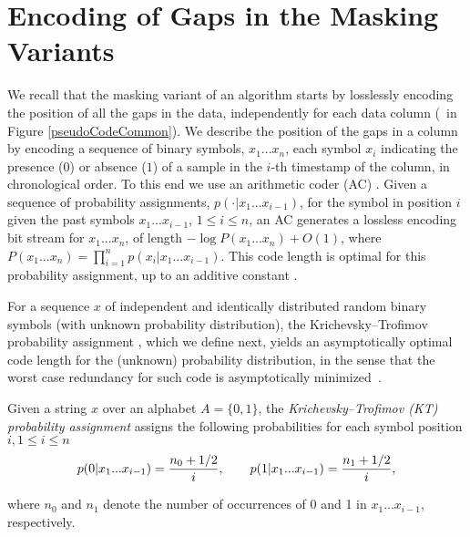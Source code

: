 
\section{Encoding of Gaps in the Masking Variants}
\label{algo:maskmodes}


\newcommand{\xOneN}{x_1...x_n}
\newcommand{\StringSeq}{x_1...x_{i-1}}
\newcommand{\xiiminus}{p(x_i|\StringSeq)}
\newcommand{\xiiminustwo}{p(\cdot|\StringSeq)}
\vspace{-5pt}
We recall that the masking variant of an algorithm starts by losslessly encoding the position of all the gaps in the data, independently for each data column (\Line \gapLine\ in Figure \ref{pseudoCodeCommon}). We describe the position of the gaps in a column by encoding a sequence of binary symbols, $\xOneN$, each symbol $x_i$ indicating the presence ($0$) or absence ($1$) of a sample in the $i$-th timestamp of the column, in chronological order. To this end we use an arithmetic coder (AC) \cite{ac2, Cover2005}. Given a sequence of probability assignments, $\xiiminustwo$, for the symbol in position $i$ given the past symbols $x_1...x_{i-1}$, $1\leq i \leq n$, an AC generates a lossless encoding bit stream for $\xOneN$, of length $-\log P(\xOneN) + O(1)$, where $P(\xOneN)=\prod_{i=1}^{n}\xiiminus$. This code length is optimal for this probability assignment, up to an additive constant \cite{arcoding}.


For a sequence $x$ of independent and identically distributed random binary symbols (with unknown probability distribution), the Krichevsky–Trofimov probability assignment \cite{ktestimator}, which we define next, yields an asymptotically optimal code length for the (unknown) probability distribution, in the sense that the worst case redundancy for such code is asymptotically minimized~\cite{unicodinginfo}.


\begin{defcion}
\label{def:ktestimator}
Given a string $x$ over an alphabet $A = \{0, 1\}$, the \textit{Krichevsky–Trofimov (KT) probability assignment} assigns the following probabilities for each symbol position $i, 1\leq i \leq n$
\vspace{-2pt}
\begin{equation}
\label{eq:ktestimator}
p(0|\StringSeq) = \frac{n_0 + 1/2}{i}, \hspace{+20pt} p(1|\StringSeq) = \frac{n_1 + 1/2}{i},
\end{equation}
\end{defcion}
\vspace{-8pt}
where $n_0$ and $n_1$ denote the number of occurrences of 0 and 1 in $\StringSeq$, respectively.


